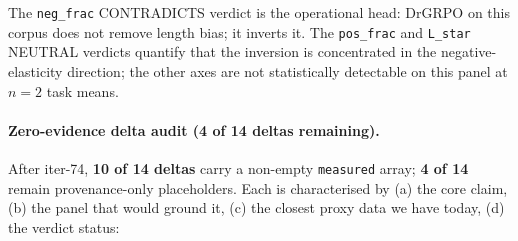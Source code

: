 The \texttt{neg\_frac} CONTRADICTS verdict is the operational head:
DrGRPO on this corpus does not remove length bias; it inverts it.
The \texttt{pos\_frac} and \texttt{L\_star} NEUTRAL verdicts
quantify that the inversion is concentrated in the
negative-elasticity direction; the other axes are not statistically
detectable on this panel at $n{=}2$ task means.

\paragraph{Zero-evidence delta audit (4 of 14 deltas remaining).}
After iter-74, \textbf{10 of 14 deltas} carry a non-empty
\texttt{measured} array; \textbf{4 of 14} remain provenance-only
placeholders. Each is characterised by (a) the core claim, (b) the
panel that would ground it, (c) the closest proxy data we have today,
(d) the verdict status:

\begin{table}[h]
\centering\small
\caption{Iter-74 zero-evidence delta audit. Each row is one of the
4 delta entries with \texttt{measured}$=[]$ after iter-74. The
``Needed panel'' column states the minimum experimental design that
would ground the entry; ``Closest proxy'' names the closest existing
repository data (most are N2-same-stack-isolated run on the canonical
40-step paired tensor).}
\label{tab:p6-zero-evidence-audit}
\end{table}

